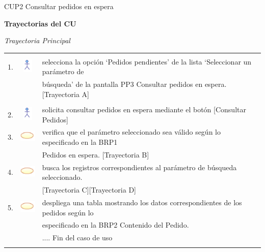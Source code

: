 \documentclass[10pt,spanish]{article}
\providecommand{\tabularnewline}{\\}
\begin{document}
\begin{table}[!ht]
	\caption{CUP2 Consultar pedidos en espera}
	\label{tab:CasosdeUso:nombredecasodeuso} 
	\end{table}


	\newpage
	\textbf{\large Trayectorias del CU}{\large \par}
	\textit{\large Trayectoria Principal}{\large{} }{\large \par}
	\begin{tabular}{ccl}
	 &  & \tabularnewline
	1. & \includegraphics{actor} & selecciona la opción ‘Pedidos pendientes’ de la lista ‘Seleccionar un parámetro de\tabularnewline
	& &  búsqueda’ de la pantalla PP3 Consultar pedidos en espera. [Trayectoria A]\tabularnewline
\tabularnewline
	2. & \includegraphics{actor} &  solicita consultar pedidos en espera mediante el botón [Consultar Pedidos]\tabularnewline
	3. & \includegraphics{sistema} & verifica que el parámetro seleccionado sea válido según lo especificado en la BRP1\tabularnewline 
	& & Pedidos en espera. [Trayectoria B]\tabularnewline
	4. & \includegraphics{sistema} & busca los registros correspondientes al parámetro de búsqueda seleccionado. \tabularnewline
	& &  [Trayectoria C][Trayectoria D]\tabularnewline
	5. & \includegraphics{sistema} & despliega una tabla mostrando los datos correspondientes de los pedidos según lo\tabularnewline
	& & especificado en la BRP2 Contenido del Pedido.\tabularnewline
	 &  & .... Fin del caso de uso\tabularnewline \\
	\end{tabular}
\end{document}
